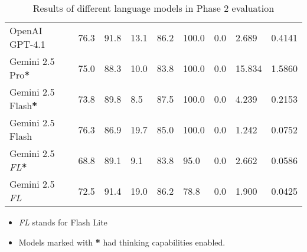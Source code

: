 \begin{table}[H]
\begin{tabularx}{\textwidth}{Xp{1.1cm}p{1.25cm}p{1.6cm}p{1.3cm}p{1.3cm}p{1.3cm}p{1.3cm}p{1.3cm}}
        \rowcolor[gray]{0.9}
        OpenAI GPT-4.1                   & 76.3                        & 91.8                            & 13.1                   & 86.2                   & 100.0                    & 0.0               & 2.689                         & 0.4141                           \\
        Gemini 2.5 Pro\textbf{*}         & 75.0                        & 88.3                            & 10.0                   & 83.8                   & 100.0                    & 0.0               & 15.834                        & 1.5860                           \\
        \rowcolor[gray]{0.9}
        Gemini 2.5 Flash\textbf{*}       & 73.8                        & 89.8                            & 8.5                    & 87.5                   & 100.0                    & 0.0               & 4.239                         & 0.2153                           \\
        Gemini 2.5 Flash                 & 76.3                        & 86.9                            & 19.7                   & 85.0                   & 100.0                    & 0.0               & 1.242                         & 0.0752                           \\
        \rowcolor[gray]{0.9}
        Gemini 2.5 \textit{FL}\textbf{*} & 68.8                        & 89.1                            & 9.1                    & 83.8                   & 95.0                     & 0.0               & 2.662                         & 0.0586                           \\
        Gemini 2.5 \textit{FL}           & 72.5                        & 91.4                            & 19.0                   & 86.2                   & 78.8                     & 0.0               & 1.900                         & 0.0425                           \\
        \bottomrule
    \end{tabularx}

    \begin{itemize}
        \footnotesize
        \item \textit{FL} stands for Flash Lite
        \item Models marked with \textbf{*} had thinking capabilities enabled.
    \end{itemize}
    \caption{Results of different language models in Phase 2 evaluation}
    \label{tab:phase2_results}
\end{table}
